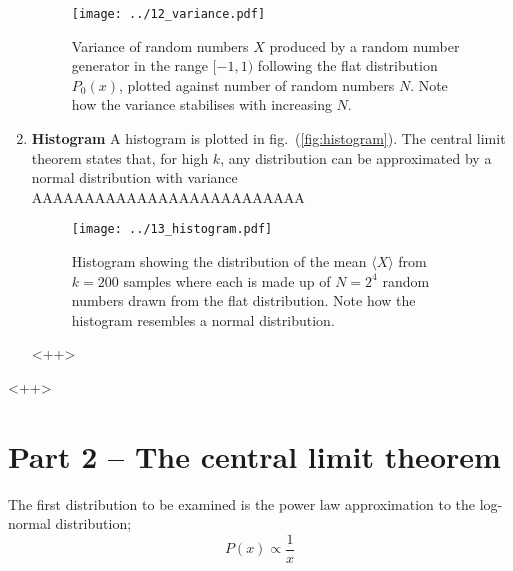 \documentclass[a4paper,11pt]{article}
\begin{document}
\begin{enumerate}
        \begin{figure}[htb]
            \begin{center}
                \texttt{[image: ../12\_variance.pdf]}
            \end{center}
            \caption{Variance of random numbers $X$ produced by a random number generator in the range $[-1,1)$ following the flat distribution $P_0(x)$, plotted against number of random numbers $N$. Note how the variance stabilises with increasing $N$. }
            \label{fig:12_variance}
        \end{figure}

    \item \textbf{Histogram} A histogram  is plotted in fig.~(\ref{fig:histogram}). The central limit theorem states that, for high $k$, any distribution can be approximated by a normal distribution with variance
        AAAAAAAAAAAAAAAAAAAAAAAAAA

        \begin{figure}[htb]
            \begin{center}
                \texttt{[image: ../13\_histogram.pdf]}
            \end{center}
            \caption{Histogram showing the distribution of the mean $\langle X \rangle$ from $k=200$ samples where each is made up of $N=2^{4}$ random numbers drawn from the flat distribution. Note how the histogram resembles a normal distribution.}
            \label{fig:13_histogram}
        \end{figure}<++>
\end{enumerate}<++>

\section{Part 2 -- The central limit theorem}
The first distribution to be examined is the power law approximation to the log-normal distribution;
\begin{equation}
    P(x) \propto \frac{1}{x}
    \label{eq:powerlawdist}
\end{equation}
\end{document}
